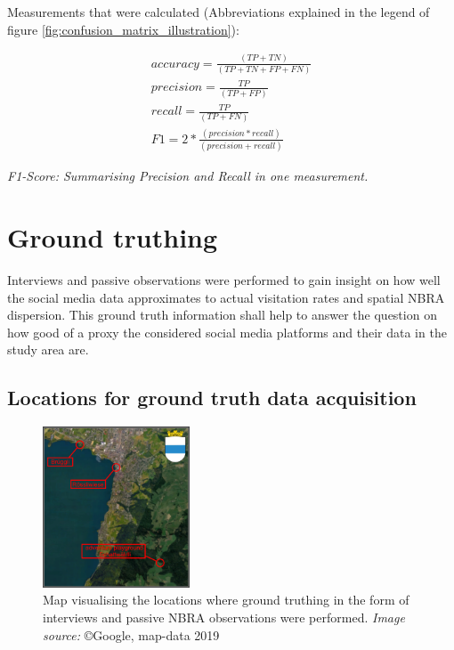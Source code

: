 Measurements that were calculated (Abbreviations explained in the legend of figure \ref{fig:confusion_matrix_illustration}):

\begin{gather*}
accuracy = \frac{(TP+TN)}{(TP+TN+FP+FN)}\\
precision = \frac{TP}{(TP+FP)}\\
recall = \frac{TP}{(TP+FN)}\\
F1 = 2*\frac{(precision*recall)}{(precision+recall)}
\end{gather*}

\textit{F1-Score: Summarising Precision and Recall in one measurement.}

\clearpage

\section{Ground truthing} \label{groud_truthing}
Interviews and passive observations were performed to gain insight on how well the social media data approximates to actual visitation rates and spatial NBRA dispersion. This ground truth information shall help to answer the question on how good of a proxy the considered social media platforms and their data in the study area are.

\subsection{Locations for ground truth data acquisition} \label{locations_ground_truthing_data}

\begin{figure} %
    \centerline{\includegraphics[trim={0 0 0 0},clip,width=0.39\textwidth]{img/interviews_locations}}
  \caption{Map visualising the locations where ground truthing in the form of interviews and passive NBRA observations were performed. \textit{Image source:} \copyright Google, map-data 2019}
  \label{fig:locations_ground_truthing}
\end{figure}

